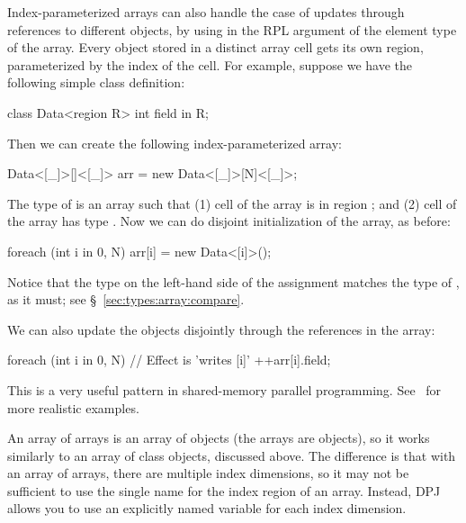 Index-parameterized arrays can also handle the case of updates through
references to different objects, by using \kwd{[\_]} in the RPL
argument of the element type of the array.  Every object stored in a
distinct array cell gets its own region, parameterized by the index of
the cell.  For example, suppose we have the following simple class
definition:
%
\begin{dpjlisting}
class Data<region R> {
    int field in R;
}
\end{dpjlisting}
%
Then we can create the following index-parameterized array:
%
\begin{dpjlisting}
Data<[_]>[]<[_]> arr = new Data<[_]>[N]<[_]>;
\end{dpjlisting}
%
The type of  is an array such that (1) cell  of the
array is in region \kwd{[i]}; and (2) cell  of the array has
type .  Now we can do disjoint initialization of the
array, as before:
%
\begin{dpjlisting}
foreach (int i in 0, N)
    arr[i] = new Data<[i]>();
\end{dpjlisting}
%
Notice that the type  on the left-hand side of the
assignment matches the type of , as it must; see
\S~\ref{sec:types:array:compare}.

We can also update the objects disjointly through the references in
the array:
%
\begin{dpjlisting}
foreach (int i in 0, N)
    // Effect is 'writes [i]'
    ++arr[i].field;
\end{dpjlisting}
%
This is a very useful pattern in shared-memory parallel programming.
See \tutorial\ for more realistic examples.

 An array of arrays is an array of objects
(the arrays are objects), so it works similarly to an array of class
objects, discussed above.  The difference is that with an array of
arrays, there are multiple index dimensions, so it may not be
sufficient to use the single name \kwd{[\_]} for the index region of
an array.  Instead, DPJ allows you to use an explicitly named variable
for each index dimension.

